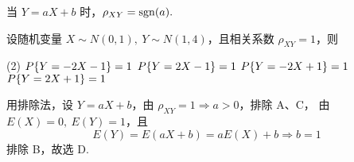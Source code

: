 \begin{theorem}
    当 $Y=aX+b$ 时，$\rho_{XY}=\mathrm{sgn}(a).$
\end{theorem}

\begin{example}
    设随机变量 $X\sim N(0,1),~Y\sim N(1,4)$，且相关系数 $\rho_{XY}=1$，则
    \begin{tasks}(2)
        \task $P\qty{Y=-2X -1}=1$
        \task $P\qty{Y=2X -1}=1$
        \task $P\qty{Y=-2X+1}=1$
        \task $P\qty{Y=2X+1}=1$
    \end{tasks}
\end{example}
\begin{solution}
    用排除法，设 $Y=aX+b$，由 $\rho_{XY}=1\Rightarrow a>0$，排除 A、C，
    由 $E(X)=0,~E(Y)=1$，且 $$E(Y)=E(aX+b)=aE(X)+b\Rightarrow b=1$$
    排除 B，故选 D.
\end{solution}